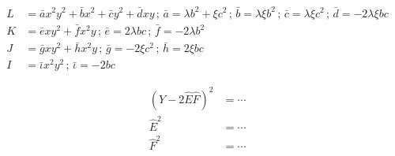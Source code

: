\documentclass[12pt]{article}
\numberwithin{table}{section}
\begin{document}
\begin{align}
L &= \bar a x^2 y^2 + \bar b x^2 + \bar c y^2 + \bar d xy \,;\,\bar a = \lambda b^2 + \xi c^2\,;\,\bar b = \lambda \xi b^2\,;\,\bar c = \lambda \xi c^2\,;\,\bar d = -2 \lambda \xi bc \\
K &= \bar e xy^2 + \bar f x^2 y \,;\,\bar e = 2 \lambda bc \,;\,\bar f = -2\lambda b^2 \\
J &= \bar g xy^2 + \bar h x^2 y \,;\,\bar g = -2\xi c^2 \,;\,\bar h = 2\xi bc \\
I &= \bar \iota x^2 y^2 \,;\, \bar \iota = -2bc
\end{align}

\begin{align}
(Y - 2\hat E \hat F)^2 &= \cdots \\
\hat E^2 &= \cdots \\
\hat F^2 &= \cdots 
\end{align}
\end{document}

